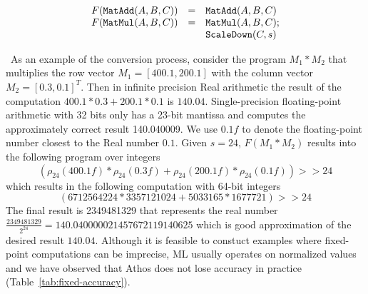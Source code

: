 \[
\begin{array}{lcl}
F({\mathtt{MatAdd}}(A,B,C)) & = & {\mathtt{MatAdd}}(A,B,C)\\
F({\mathtt{MatMul}}(A,B,C)) &= &{\mathtt{MatMul}}(A,B,C);\\
& &{\mathtt{ScaleDown}}(C,s)
\end{array}
\]


\
As an example of the conversion process, consider the program $M_1*M_2$ that multiplies
the row vector $M_1=[400.1,200.1]$ with the column vector $M_2=[0.3,0.1]^T$.
Then in infinite precision Real arithmetic the result of the computation
$400.1*0.3+200.1*0.1$
is $140.04$. Single-precision floating-point 
arithmetic with 32 bits only has a 23-bit mantissa and computes the approximately correct result 140.040009.
We use $0.1f$ to denote the floating-point number closest to the Real number $0.1$. 
Given $s=24$, $F(M_1*M_2)$ results 
into the following program over integers
\[
(\rho_{24}(400.1f)*\rho_{24}(0.3f)+\rho_{24}(200.1f)*\rho_{24}(0.1f)) >> {24}
\]
which results in the following computation with 64-bit integers
\[
(6712564224*3357121024+5033165*1677721)>>{24}
\]
The final result is 2349481329 that represents the real number
$\frac{2349481329}{2^{24}}=140.040000021457672119140625$ which is good approximation of the desired result $140.04$. Although it is feasible to constuct examples where fixed-point computations
can be imprecise, ML usually operates on normalized values and we have observed that Athos does not lose accuracy in practice (Table~\ref{tab:fixed-accuracy}).

